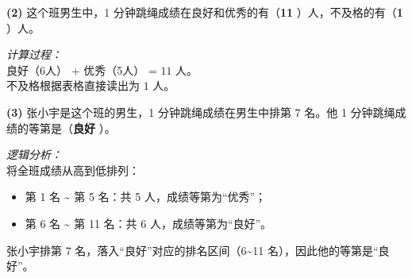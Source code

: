 \documentclass[12pt, a4paper]{ctexart}
\begin{document}
{\small
\textbf{(2)} 这个班男生中，1 分钟跳绳成绩在良好和优秀的有（\quad \textbf{11} \quad）人，不及格的有（\quad \textbf{1} \quad）人。

\vspace{0.2cm}
\textit{计算过程：} \\
良好（6人） + 优秀（5人） = $11$ 人。\\
不及格根据表格直接读出为 $1$ 人。

\vspace{0.6cm}
\textbf{(3)} 张小宇是这个班的男生，1 分钟跳绳成绩在男生中排第 7 名。他 1 分钟跳绳成绩的等第是（\quad \textbf{良好} \quad）。

\vspace{0.2cm}
\textit{逻辑分析：} \\
将全班成绩从高到低排列：
\begin{itemize}
  \item 第 1 名 \textasciitilde{} 第 5 名：共 5 人，成绩等第为“优秀”；
  \item 第 6 名 \textasciitilde{} 第 11 名：共 6 人，成绩等第为“良好”。
\end{itemize}
张小宇排第 7 名，落入“良好”对应的排名区间（6\textasciitilde11 名），因此他的等第是“良好”。
}
\end{document}
